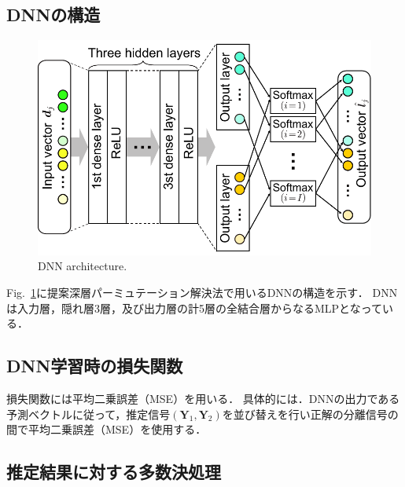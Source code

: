 \documentclass[a4j]{jsarticle}
\begin{document}
\subsection{DNNの構造}
\begin{figure}[t]
  \begin{center}
      \includegraphics[width=0.8\columnwidth]{figures/architecture_DNN.pdf}
  \end{center}
  \vspace{-8pt}
\caption{DNN architecture.}
\label{fig:Dnnmodel}
\end{figure}
Fig.~\ref{fig:Dnnmodel}に提案深層パーミュテーション解決法で用いるDNNの構造を示す．
DNNは入力層，隠れ層3層，及び出力層の計5層の全結合層からなるMLPとなっている．

\subsection{DNN学習時の損失関数}
損失関数には平均二乗誤差（MSE）を用いる．
具体的には．DNNの出力である予測ベクトルに従って，推定信号$(\bm{Y}_1, \bm{Y}_2)$を並び替えを行い正解の分離信号の間で平均二乗誤差（MSE）を使用する．

\subsection{推定結果に対する多数決処理}
\end{document}
